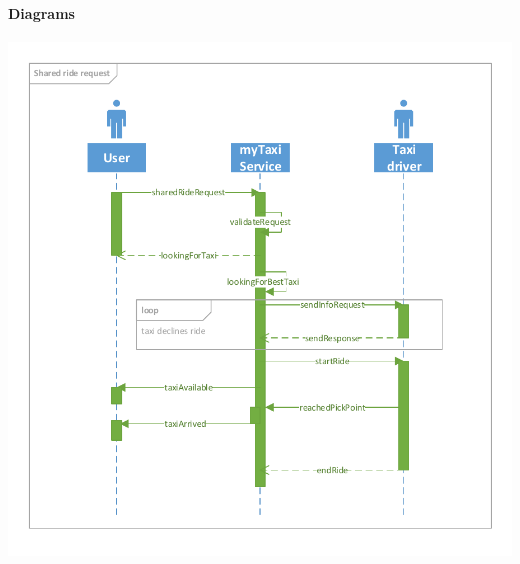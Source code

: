 	\paragraph{Diagrams}
	\begin{center}
	\includegraphics[height=\textwidth]{diagrams/shared_request}
\end{center}
	
